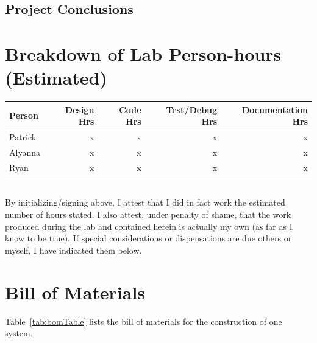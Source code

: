 \documentclass[12pt]{article} %
\begin{document}
\subsection{Project Conclusions} %


\pagebreak
\appendix


\section{Breakdown of Lab Person-hours (Estimated)}
\begin{tabular}{|l|*{4}{r|}}
	\hline
	Person & Design Hrs & Code Hrs & Test/Debug Hrs & Documentation Hrs \\ \hline
	Patrick & x & x & x & x  \\ \hline
	Alyanna & x & x & x & x \\ \hline
	Ryan & x & x & x & x  \\ \hline
\end{tabular}

~\\

By initializing/signing above, I attest that I did in fact work the
estimated number of hours stated. I also attest, under penalty of shame,
that the work produced during the lab and contained herein is actually my
own (as far as I know to be true). If special considerations or
dispensations are due others or myself, I have indicated them below.

\pagebreak

\section{Bill of Materials\label{appendix:bom}}
Table~\ref{tab:bomTable} lists the bill of materials for the construction of one system.
\end{document}
